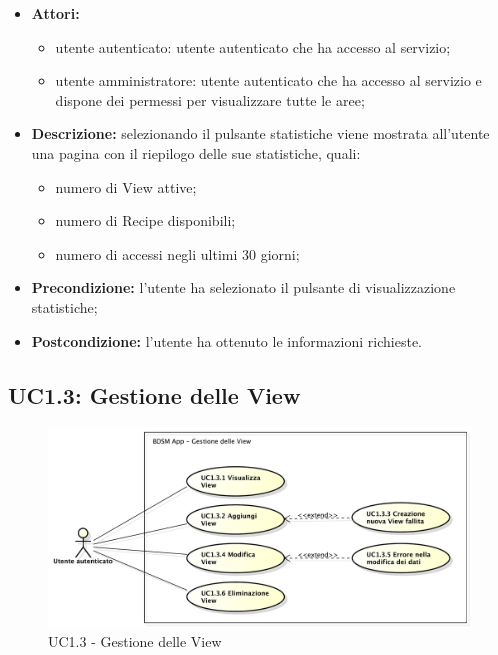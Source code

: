 \begin{itemize}
    \item \textbf{Attori:}
    \begin{itemize}
        \item utente autenticato: utente autenticato che ha accesso al servizio;
        \item utente amministratore: utente autenticato che ha accesso al servizio e dispone dei permessi per visualizzare tutte le aree;
    \end{itemize}
    \item \textbf{Descrizione:} selezionando il pulsante statistiche viene mostrata all'utente una pagina con il riepilogo delle sue statistiche, quali:
    \begin{itemize}
        \item numero di View\gloss{} attive;
        \item numero di Recipe\gloss{} disponibili;
        \item numero di accessi negli ultimi 30 giorni;
    \end{itemize}
    \item \textbf{Precondizione:} l'utente ha selezionato il pulsante di visualizzazione statistiche;
    \item \textbf{Postcondizione:} l'utente ha ottenuto le informazioni richieste.
\end{itemize}

\pagebreak
\subsection{UC1.3: Gestione delle View}

\begin{figure}[!htbp]
    \centering
    \centerline{\includegraphics[scale=0.45]{./images/UC1_3.pdf}}
    \caption{UC1.3 - Gestione delle View}
\end{figure}

